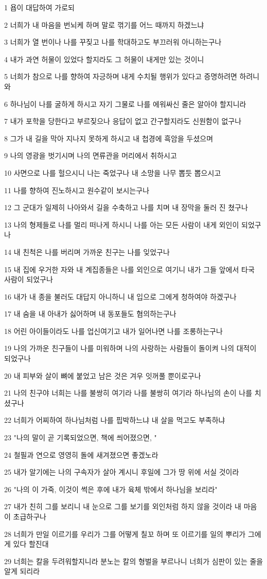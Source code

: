 \par 1 욥이 대답하여 가로되
\par 2 너희가 내 마음을 번뇌케 하며 말로 꺾기를 어느 때까지 하겠느냐
\par 3 너희가 열 번이나 나를 꾸짖고 나를 학대하고도 부끄러워 아니하는구나
\par 4 내가 과연 허물이 있었다 할지라도 그 허물이 내게만 있는 것이니
\par 5 너희가 참으로 나를 향하여 자긍하며 내게 수치될 행위가 있다고 증명하려면 하려니와
\par 6 하나님이 나를 굴하게 하시고 자기 그물로 나를 에워싸신 줄은 알아야 할지니라
\par 7 내가 포학을 당한다고 부르짖으나 응답이 없고 간구할지라도 신원함이 없구나
\par 8 그가 내 길을 막아 지나지 못하게 하시고 내 첩경에 흑암을 두셨으며
\par 9 나의 영광을 벗기시며 나의 면류관을 머리에서 취하시고
\par 10 사면으로 나를 헐으시니 나는 죽었구나 내 소망을 나무 뽑듯 뽑으시고
\par 11 나를 향하여 진노하시고 원수같이 보시는구나
\par 12 그 군대가 일제히 나아와서 길을 수축하고 나를 치며 내 장막을 둘러 진 쳤구나
\par 13 나의 형제들로 나를 멀리 떠나게 하시니 나를 아는 모든 사람이 내게 외인이 되었구나
\par 14 내 친척은 나를 버리며 가까운 친구는 나를 잊었구나
\par 15 내 집에 우거한 자와 내 계집종들은 나를 외인으로 여기니 내가 그들 앞에서 타국 사람이 되었구나
\par 16 내가 내 종을 불러도 대답지 아니하니 내 입으로 그에게 청하여야 하겠구나
\par 17 내 숨을 내 아내가 싫어하며 내 동포들도 혐의하는구나
\par 18 어린 아이들이라도 나를 업신여기고 내가 일어나면 나를 조롱하는구나
\par 19 나의 가까운 친구들이 나를 미워하며 나의 사랑하는 사람들이 돌이켜 나의 대적이 되었구나
\par 20 내 피부와 살이 뼈에 붙었고 남은 것은 겨우 잇꺼풀 뿐이로구나
\par 21 나의 친구야 너희는 나를 불쌍히 여기라 나를 불쌍히 여기라 하나님의 손이 나를 치셨구나
\par 22 너희가 어찌하여 하나님처럼 나를 핍박하느냐 내 살을 먹고도 부족하냐
\par 23 "나의 말이 곧 기록되었으면, 책에 씌어졌으면, "
\par 24 철필과 연으로 영영히 돌에 새겨졌으면 좋겠노라
\par 25 내가 알기에는 나의 구속자가 살아 계시니 후일에 그가 땅 위에 서실 것이라
\par 26 "나의 이 가죽, 이것이 썩은 후에 내가 육체 밖에서 하나님을 보리라"
\par 27 내가 친히 그를 보리니 내 눈으로 그를 보기를 외인처럼 하지 않을 것이라 내 마음이 초급하구나
\par 28 너희가 만일 이르기를 우리가 그를 어떻게 칠꼬 하며 또 이르기를 일의 뿌리가 그에게 있다 할진대
\par 29 너희는 칼을 두려워할지니라 분노는 칼의 형벌을 부르나니 너희가 심판이 있는 줄을 알게 되리라

